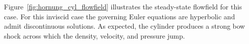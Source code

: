  Figure~\ref{fig:hornung_cyl_flowfield} illustrates the steady-state flowfield for this case.  For this inviscid case the governing Euler equations are hyperbolic and admit discontinuous solutions. As expected, the cylinder produces a strong bow shock across which the density, velocity, and pressure jump. 
\begin{figure}[hbtp]
  \begin{center}

\end{center}
\end{figure}

